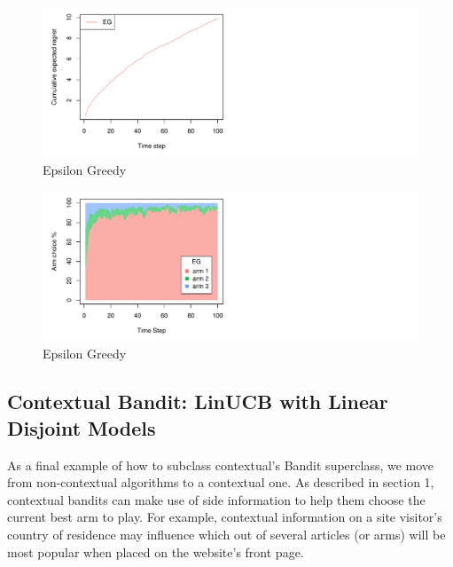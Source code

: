 \documentclass[nojss]{jss}\usepackage[]{graphicx}\usepackage[]{color}
\makeatletter
\def\maxwidth{ %
  \ifdim\Gin@nat@width>\linewidth
    \linewidth
  \else
    \Gin@nat@width
  \fi
}
\newenvironment{knitrout}{}{} %
\makeatother
\begin{document}
\begin{center}
\begin{knitrout}
\color{fgcolor}\begin{figure}[H]
\includegraphics[width=\maxwidth,]{fig/egpolicy-1} \caption[Epsilon Greedy]{Epsilon Greedy}\label{fig:egpolicy1}
\end{figure}

\begin{figure}[H]
\includegraphics[width=\maxwidth,]{fig/egpolicy-2} \caption[Epsilon Greedy]{Epsilon Greedy}\label{fig:egpolicy2}
\end{figure}


\end{knitrout}
\end{center}

\subsection{Contextual Bandit: LinUCB with Linear Disjoint Models}

As a final example of how to subclass contextual's Bandit superclass, we move from non-contextual algorithms to a contextual one. As described in section 1, contextual bandits can make use of side information to help them choose the current best arm to play. For example, contextual information on a site visitor's country of residence may influence which out of several articles (or arms) will be most popular when placed on the website's front page.
\end{document}
